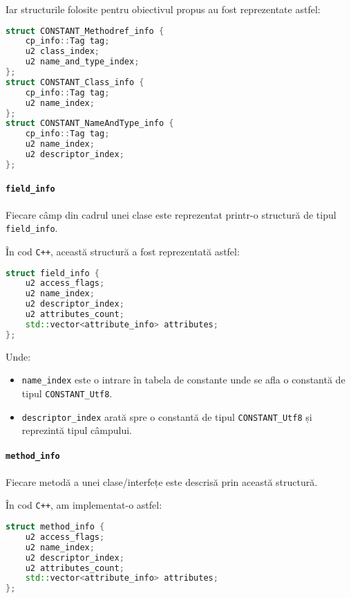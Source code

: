 Iar structurile folosite pentru obiectivul propus au fost reprezentate
astfel:

\begin{lstlisting}[language=C++]
struct CONSTANT_Methodref_info {
    cp_info::Tag tag;
    u2 class_index;
    u2 name_and_type_index;
};
struct CONSTANT_Class_info {
    cp_info::Tag tag;
    u2 name_index;
};
struct CONSTANT_NameAndType_info {
    cp_info::Tag tag;
    u2 name_index;
    u2 descriptor_index;
};
\end{lstlisting}

\paragraph{\texorpdfstring{\texttt{field\_info}}{field\_info}}\label{field_info}

Fiecare câmp din cadrul unei clase este reprezentat printr-o structură
de tipul \texttt{field\_info}.

În cod \texttt{C++}, această structură a fost reprezentată astfel:

\begin{lstlisting}[language=C++]
struct field_info {
    u2 access_flags;
    u2 name_index;
    u2 descriptor_index;
    u2 attributes_count;
    std::vector<attribute_info> attributes;
};
\end{lstlisting}

Unde:
\begin{itemize}
	\item \texttt{name\_index} este o intrare în tabela de constante unde se afla o constantă de tipul \texttt{CONSTANT\_Utf8}.
	\item \texttt{descriptor\_index} arată spre o constantă de tipul \texttt{CONSTANT\_Utf8} și reprezintă tipul câmpului.
\end{itemize}

\paragraph{\texorpdfstring{\texttt{method\_info}}{method\_info}}\label{method_info}

Fiecare metodă a unei clase/interfețe este descrisă prin această
structură.

În cod \texttt{C++}, am implementat-o astfel:

\begin{lstlisting}[language=C++]
struct method_info {
    u2 access_flags;
    u2 name_index;
    u2 descriptor_index;
    u2 attributes_count;
    std::vector<attribute_info> attributes;
};
\end{lstlisting}

